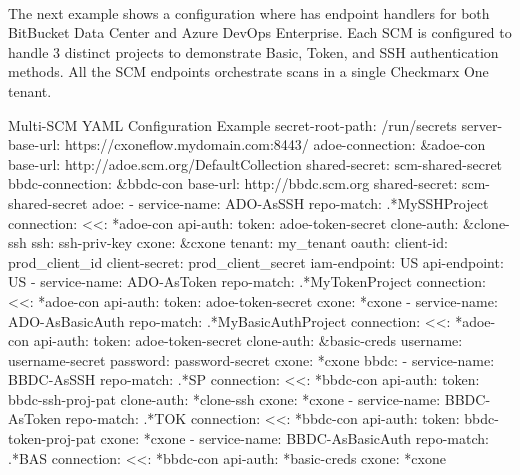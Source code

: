 \pagebreak
\noindent\\The next example shows a configuration where \cxoneflow has endpoint handlers for both
BitBucket Data Center and Azure DevOps Enterprise.  Each SCM is configured to handle 3 distinct
projects to demonstrate Basic, Token, and SSH authentication methods.  All the SCM endpoints
orchestrate scans in a single Checkmarx One tenant.

\begin{code}{Multi-SCM YAML Configuration Example}{}{}
secret-root-path: /run/secrets
server-base-url: https://cxoneflow.mydomain.com:8443/
adoe-connection: &adoe-con
    base-url: http://adoe.scm.org/DefaultCollection
    shared-secret: scm-shared-secret
bbdc-connection: &bbdc-con
    base-url: http://bbdc.scm.org
    shared-secret: scm-shared-secret
adoe:
    - service-name: ADO-AsSSH
        repo-match: .*MySSHProject
        connection:
        <<: *adoe-con
        api-auth: 
            token: adoe-token-secret
        clone-auth: &clone-ssh
            ssh: ssh-priv-key
        cxone: &cxone
        tenant: my_tenant
        oauth:
            client-id: prod_client_id
            client-secret: prod_client_secret
        iam-endpoint: US
        api-endpoint: US
    - service-name: ADO-AsToken
        repo-match: .*MyTokenProject
        connection:
        <<: *adoe-con
        api-auth:
            token: adoe-token-secret
        cxone: *cxone
    - service-name: ADO-AsBasicAuth
        repo-match: .*MyBasicAuthProject
        connection:
        <<: *adoe-con
        api-auth:
            token: adoe-token-secret
        clone-auth: &basic-creds
            username: username-secret
            password: password-secret
        cxone: *cxone
bbdc:
    - service-name: BBDC-AsSSH
        repo-match: .*SP
        connection:
        <<: *bbdc-con
        api-auth: 
            token: bbdc-ssh-proj-pat
        clone-auth: *clone-ssh
        cxone: *cxone
    - service-name: BBDC-AsToken
        repo-match: .*TOK
        connection:
        <<: *bbdc-con
        api-auth:
            token: bbdc-token-proj-pat
        cxone: *cxone
    - service-name: BBDC-AsBasicAuth
        repo-match: .*BAS
        connection:
        <<: *bbdc-con
        api-auth: *basic-creds
        cxone: *cxone
\end{code}
